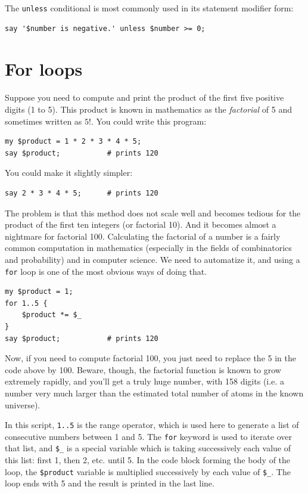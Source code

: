 The {\tt unless} conditional is most commonly used in its statement modifier form:

\begin{verbatim}
say '$number is negative.' unless $number >= 0;
\end{verbatim}
%

\section{For loops}
\label{for_loops}

Suppose you need to compute and print the product of the first 
five positive digits (1 to 5). This product is known in mathematics 
as the \emph{factorial} of 5 and sometimes written as $5!$. You could write this program:

\begin{verbatim}
my $product = 1 * 2 * 3 * 4 * 5;
say $product;           # prints 120
\end{verbatim}
%

You could make it slightly simpler:
\begin{verbatim}
say 2 * 3 * 4 * 5;      # prints 120
\end{verbatim}
%

The problem is that this method does 
not scale well and becomes tedious for the product of the first 
ten integers (or factorial 10). And it becomes almost a 
nightmare for factorial 100. 
Calculating the factorial of a number is a fairly common computation 
in mathematics (especially in the fields of combinatorics 
and probability) and in computer science. We need to 
automatize it, and using a {\tt for} 
loop is one of the most obvious ways of doing that.

\begin{verbatim}
my $product = 1;
for 1..5 {
    $product *= $_
}
say $product;           # prints 120
\end{verbatim}

Now, if you need to compute factorial 100, you just need to 
replace the 5 in the code above by 100. Beware, though, 
the factorial function is known to grow extremely rapidly, 
and you'll get a truly huge number, with 158 digits 
(i.e. a number very much larger than the estimated total 
number of atoms in the known universe).

In this script, {\tt 1..5} is the range operator, which is used here 
to generate a list of consecutive numbers between 1 and 5. The 
{\tt for} keyword is used to iterate over that list, and  
\verb"$_" is a special variable which is taking successively 
each value of this list: first 1, then 2, etc. until 5. In the code 
block forming the body of the loop, the {\tt \$product} variable 
is multiplied successively by each value of \verb"$_". The loop 
ends with 5 and the result is printed in the last line.

